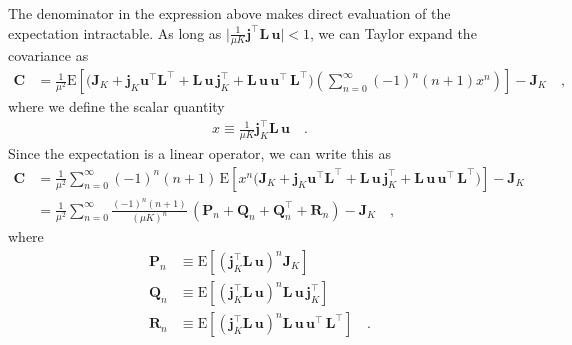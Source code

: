 \documentclass[modern]{aastex62}
\begin{document}
%
The denominator in the expression above makes direct evaluation of the expectation
intractable. As long as
$\big| \frac{1}{\mu K}\mathbf{j}^\top \mathbf{L} \, \mathbf{u} \big| < 1$, we
can Taylor expand the covariance as
%
\begin{align}
    \mathbf{C}
     & =
    \frac{1}{\mu^2}
    \mathrm{E}\left[
        \Bigg(
        \mathbf{J}_K
        +
        \mathbf{j}_K\mathbf{u}^\top \mathbf{L}^\top
        +
        \mathbf{L} \, \mathbf{u} \, \mathbf{j}_K^\top
        +
        \mathbf{L} \, \mathbf{u} \, \mathbf{u}^\top \, \mathbf{L}^\top
        \Bigg)
        \left(
        \sum\limits_{n=0}^\infty
        (-1)^n (n + 1) x^n
        \right)
        \right]
    - \mathbf{J}_K
    \quad,
\end{align}
%
where we define the scalar quantity
%
\begin{align}
    x \equiv \frac{1}{\mu K}\mathbf{j}_K^\top \mathbf{L} \, \mathbf{u}
    \quad.
\end{align}
%
Since the expectation is a linear operator, we can write this as
%
\begin{align}
    \mathbf{C}
     & =
    \frac{1}{\mu^2}
    \sum\limits_{n=0}^\infty
    (-1)^n (n + 1)
    \,
    \mathrm{E}\left[
        x^n
        \Bigg(
        \mathbf{J}_K
        +
        \mathbf{j}_K\mathbf{u}^\top \mathbf{L}^\top
        +
        \mathbf{L} \, \mathbf{u} \, \mathbf{j}_K^\top
        +
        \mathbf{L} \, \mathbf{u} \, \mathbf{u}^\top \, \mathbf{L}^\top
        \Bigg)
        \right]
    - \mathbf{J}_K
    \nonumber \\[0.5em]
     & =
    \frac{1}{\mu^2}
    \sum\limits_{n=0}^\infty
    \frac{(-1)^n (n + 1)}{(\mu K)^n}
    \,
    \left(
    \mathbf{P}_n
    +
    \mathbf{Q}_n
    +
    \mathbf{Q}_n^\top
    +
    \mathbf{R}_n
    \right)
    - \mathbf{J}_K
    \quad,
\end{align}
%
where
%
\begin{align}
    \mathbf{P}_n & \equiv \mathrm{E}\left[ \left(\mathbf{j}_K^\top \mathbf{L} \, \mathbf{u}\right)^n \mathbf{J}_K \right]
    \nonumber                                                                                                                                                               \\[0.5em]
    \mathbf{Q}_n & \equiv \mathrm{E}\left[ \left(\mathbf{j}_K^\top \mathbf{L} \, \mathbf{u}\right)^n \mathbf{L} \, \mathbf{u} \, \mathbf{j}_K^\top \right]
    \nonumber                                                                                                                                                               \\[0.5em]
    \mathbf{R}_n & \equiv \mathrm{E}\left[ \left(\mathbf{j}_K^\top \mathbf{L} \, \mathbf{u}\right)^n \mathbf{L} \, \mathbf{u} \, \mathbf{u}^\top \, \mathbf{L}^\top \right]
    \quad.
\end{align}
\end{document}
